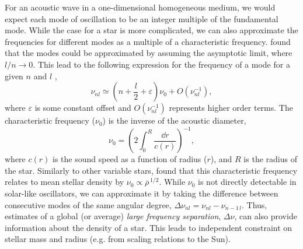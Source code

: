 For an acoustic wave in a one-dimensional homogeneous medium, we would expect each mode of oscillation to be an integer multiple of the fundamental mode. While the case for a star is more complicated, we can also approximate the frequencies for different modes as a multiple of a characteristic frequency. \citet{Tassoul1980} found that the modes could be approximated by assuming the asymptotic limit, where \(l/n \rightarrow 0\). This lead to the following expression for the frequency of a mode for a given \(n\) and \(l\) \citep[cf.][]{Gough1986},
%
\begin{equation}
    \nu_{nl} \simeq \left(n + \frac{l}{2} + \varepsilon\right) \nu_0 + O(\nu_{nl}^{-1}), \label{eq:asy}
\end{equation}
%
where \(\varepsilon\) is some constant offset and \(O(\nu_{nl}^{-1})\) represents higher order terms. The characteristic frequency (\(\nu_0\)) is the inverse of the acoustic diameter,
%
\begin{equation}
    \nu_0 = \left(2 \int_{0}^{R} \frac{\dd r}{c(r)}\right)^{-1},
\end{equation}
%
where \(c(r)\) is the sound speed as a function of radius (\(r\)), and \(R\) is the radius of the star. Similarly to other variable stars, \citet{Ulrich1986} found that this characteristic frequency relates to mean stellar density by \(\nu_0 \propto \overline{\rho}^{\,1/2}\). While \(\nu_0\) is not directly detectable in solar-like oscillators, we can approximate it by taking the difference between consecutive modes of the same angular degree, \(\Delta\nu_{nl} = \nu_{nl} - \nu_{n-1\,l}\). Thus, estimates of a global (or average) \emph{large frequency separation}, \(\Delta\nu\), can also provide information about the density of a star. This leads to independent constraint on stellar mass and radius (e.g. from scaling relations to the Sun).

